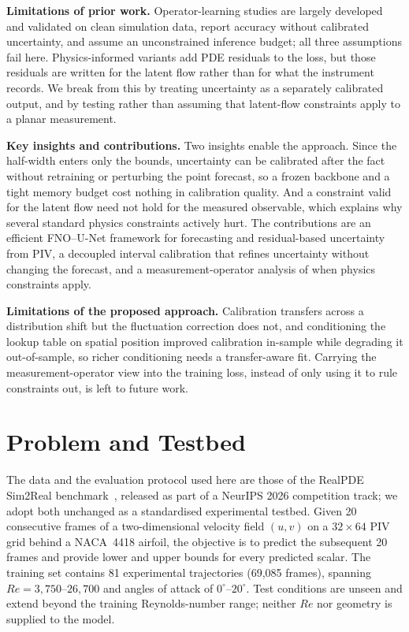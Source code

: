 \documentclass[conference,10pt]{IEEEtran}
\begin{document}
\textbf{Limitations of prior work.} Operator-learning studies are largely developed and validated on clean simulation data, report accuracy without calibrated uncertainty, and assume an unconstrained inference budget; all three assumptions fail here. Physics-informed variants add PDE residuals to the loss, but those residuals are written for the latent flow rather than for what the instrument records. We break from this by treating uncertainty as a separately calibrated output, and by testing rather than assuming that latent-flow constraints apply to a planar measurement.

\textbf{Key insights and contributions.} Two insights enable the approach. Since the half-width enters only the bounds, uncertainty can be calibrated after the fact without retraining or perturbing the point forecast, so a frozen backbone and a tight memory budget cost nothing in calibration quality. And a constraint valid for the latent flow need not hold for the measured observable, which explains why several standard physics constraints actively hurt. The contributions are an efficient FNO--U-Net framework for forecasting and residual-based uncertainty from PIV, a decoupled interval calibration that refines uncertainty without changing the forecast, and a measurement-operator analysis of when physics constraints apply.

\textbf{Limitations of the proposed approach.} Calibration transfers across a distribution shift but the fluctuation correction does not, and conditioning the lookup table on spatial position improved calibration in-sample while degrading it out-of-sample, so richer conditioning needs a transfer-aware fit. Carrying the measurement-operator view into the training loss, instead of only using it to rule constraints out, is left to future work.

\section{Problem and Testbed}
The data and the evaluation protocol used here are those of the RealPDE Sim2Real benchmark~\cite{realpdebench}, released as part of a NeurIPS 2026 competition track; we adopt both unchanged as a standardised experimental testbed. Given 20 consecutive frames of a two-dimensional velocity field $(u,v)$ on a $32\times 64$ PIV grid behind a NACA~4418 airfoil, the objective is to predict the subsequent 20 frames and provide lower and upper bounds for every predicted scalar. The training set contains 81 experimental trajectories (69,085 frames), spanning $Re=3{,}750$--$26{,}700$ and angles of attack of $0^\circ$--$20^\circ$. Test conditions are unseen and extend beyond the training Reynolds-number range; neither $Re$ nor geometry is supplied to the model.
\end{document}

